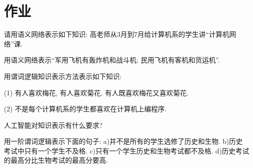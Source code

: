 \section{作业}

\begin{think}
    请用语义网络表示如下知识: 高老师从3月到7月给计算机系的学生讲“计算机网络”课.
\end{think}
\begin{think}
    用语义网络表示“军用飞机有轰炸机和战斗机; 民用飞机有客机和货运机”.
\end{think}
\begin{observe}
    用谓词逻辑知识表示方法表示如下知识:

    (1) 有人喜欢梅花, 有人喜欢菊花, 有人既喜欢梅花又喜欢菊花.

    (2) 不是每个计算机系的学生都喜欢在计算机上编程序.
\end{observe}

\begin{think}
    人工智能对知识表示有什么要求?
\end{think}

\begin{think}
    用一阶谓词逻辑表示下面的句子: a)并不是所有的学生选修了历史和生物. b)历史考试中只有一个学生不及格. c)只有一个学生历史和生物考试都不及格. d)历史考试的最高分比生物考试的最高分要高.
\end{think}


